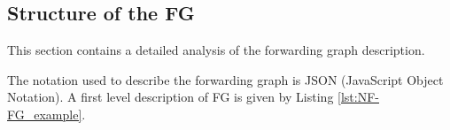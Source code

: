 \subsection{Structure of the FG}
This section contains a detailed analysis of the forwarding graph description.

The notation used to describe the forwarding graph is JSON (JavaScript Object Notation). A first level description of FG is given by Listing \ref{lst:NF-FG_example}.

